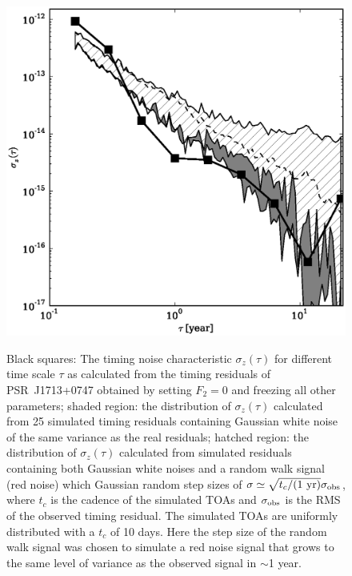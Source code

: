 \documentclass[12pt,preprint]{aastex}
\begin{document}
\begin{figure}
\includegraphics[scale=0.6]{1713_TN.ps} \\ 
\caption {\label{fig:TN} Black squares: The timing noise characteristic
$\sigma_z(\tau)$ \citep{mte97} for different time scale $\tau$ as calculated
from the timing residuals of PSR~J1713+0747 obtained by setting $F_2=0$ and
freezing all other parameters; shaded region:
the distribution of $\sigma_z(\tau)$ calculated from 25 simulated timing residuals containing 
Gaussian white noise of the same variance as the real residuals; hatched
region: the distribution of $\sigma_z(\tau)$ calculated from simulated 
residuals containing both Gaussian white noises and a
random walk signal (red noise) which Gaussian random step sizes of
$\sigma\simeq\sqrt{t_c/(1~{\rm yr})}\sigma_{\rm obs}$, where $t_c$ is the
cadence of the simulated TOAs and $\sigma_{\rm obs}$ is the RMS of the
observed timing residual.
The simulated TOAs are uniformly distributed with a $t_c$ of 10 days.
Here the step size of the random walk signal was chosen to simulate a red
noise signal that grows to the same level of variance as the observed
signal in $\sim$1 year.
} 
\end{figure} 
\end{document}
